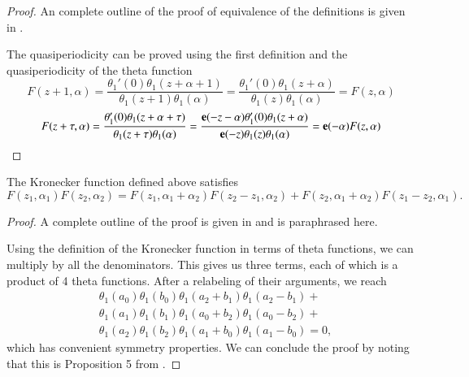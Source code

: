 \begin{proof}
    An complete outline of the proof of equivalence of the definitions is given in \cite{BL13}.

    The quasiperiodicity can be proved using the first definition and the quasiperiodicity of the theta function
    \begin{equation}
        F(z+1,\alpha) = \frac{\theta_1'(0)\theta_1(z+\alpha+1)}{\theta_1(z+1)\theta_1(\alpha)} = \frac{\theta_1'(0)\theta_1(z+\alpha)}{\theta_1(z)\theta_1(\alpha)} = F(z,\alpha)
    \end{equation}
    \begin{equation}
        F(z+\tau,\alpha) = \frac{\theta_1'(0)\theta_1(z+\alpha+\tau)}{\theta_1(z+\tau)\theta_1(\alpha)} = \frac{\mathbf{e}(-z-\alpha)\theta_1'(0)\theta_1(z+\alpha)}{\mathbf{e}(-z)\theta_1(z)\theta_1(\alpha)} = \mathbf{e}(-\alpha) F(z,\alpha)
    \end{equation}
\end{proof}

\begin{theorem}
    The Kronecker function defined above satisfies
    \begin{equation}\label{eqnB12:FayKronecker}
        {F}(z_1,\alpha_1){F}(z_2,\alpha_2) = {F}(z_1,\alpha_1+\alpha_2){F}(z_2-z_1,\alpha_2) + {F}(z_2,\alpha_1+\alpha_2){F}(z_1-z_2,\alpha_1).
    \end{equation}
\end{theorem}

\begin{proof}
    A complete outline of the proof is given in \cite{Mat19} and is paraphrased here.

    Using the definition of the Kronecker function in terms of theta functions, we can multiply by all the denominators.
    This gives us three terms, each of which is a product of 4 theta functions. After a relabeling of their arguments, we reach
    \begin{align}
        & \theta_1(a_0)\theta_1(b_0)\theta_1(a_2+b_1)\theta_1(a_2-b_1) + \\
        & \theta_1(a_1)\theta_1(b_1)\theta_1(a_0+b_2)\theta_1(a_0-b_2) + \\
        & \theta_1(a_2)\theta_1(b_2)\theta_1(a_1+b_0)\theta_1(a_1-b_0) = 0,
    \end{align}
    which has convenient symmetry properties. We can conclude the proof by noting that this is Proposition 5 from \cite{Zagier1991}.
\end{proof}


